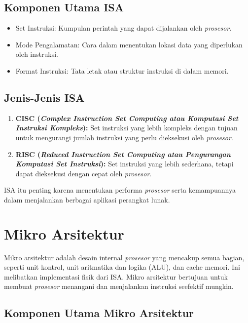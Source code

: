 \documentclass{article}
\begin{document}
\subsection{Komponen Utama ISA}

\begin{itemize}
  \item Set Instruksi: Kumpulan perintah yang dapat dijalankan oleh \textit{prosesor}.
  \item Mode Pengalamatan: Cara dalam menentukan lokasi data yang diperlukan oleh instruksi.
  \item Format Instruksi: Tata letak atau struktur instruksi di dalam memori.
\end{itemize}

\subsection{Jenis-Jenis ISA}

\begin{enumerate}[label=\arabic*.]
  \item \textbf{CISC (\textit{Complex Instruction Set Computing atau Komputasi Set Instruksi Kompleks}):} Set instruksi yang lebih kompleks dengan tujuan untuk mengurangi jumlah instruksi yang perlu dieksekusi oleh \textit{prosesor}.
  \item \textbf{RISC (\textit{Reduced Instruction Set Computing atau Pengurangan Komputasi Set Instruksi}):} Set instruksi yang lebih sederhana, tetapi dapat dieksekusi dengan cepat oleh \textit{prosesor}.
\end{enumerate}

ISA itu penting karena menentukan performa \textit{prosesor} serta kemampuannya dalam menjalankan berbagai aplikasi perangkat lunak.

\section{Mikro Arsitektur}

Mikro arsitektur adalah desain internal \textit{prosesor} yang mencakup semua bagian, seperti unit kontrol, unit aritmatika dan logika (ALU), dan cache memori. Ini melibatkan implementasi fisik dari ISA. Mikro arsitektur bertujuan untuk membuat \textit{prosesor} menangani dan menjalankan instruksi seefektif mungkin.

\subsection{Komponen Utama Mikro Arsitektur}
\end{document}
